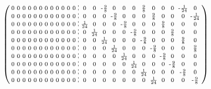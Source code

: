 \documentclass[pdftex,a4paper,parskip,listof=totoc,bibliography=totoc,onehalfspacing,12pt]{scrreprt}
\newcommand*\dashline{\hspace{-0.3em}\rotatebox[origin=c]{90}{\scalebox{-0.3}[1]{$-~~-$}}\hspace{-0.3em}}
\begin{document}
\begin{align*}
\begin{psmallmatrix}
0 & 0 & 0 & 0 & 0 & 0 & 0 & 0 & 0 & 0 & 0 & 0 &\dashline& 0 & 0 & \text{-}\frac{9}{8} & 0 & 0 & 0 & \frac{9}{8} & 0 & 0 & 0 & \text{-}\frac{1}{24} & 0 \\
0 & 0 & 0 & 0 & 0 & 0 & 0 & 0 & 0 & 0 & 0 & 0 &\dashline& 0 & 0 & 0 & \text{-}\frac{9}{8} & 0 & 0 & 0 & \frac{9}{8} & 0 & 0 & 0 & \text{-}\frac{1}{24} \\
0 & 0 & 0 & 0 & 0 & 0 & 0 & 0 & 0 & 0 & 0 & 0 &\dashline& \frac{1}{24} & 0 & 0 & 0 & \text{-}\frac{9}{8} & 0 & 0 & 0 & \frac{9}{8} & 0 & 0 & 0 \\
0 & 0 & 0 & 0 & 0 & 0 & 0 & 0 & 0 & 0 & 0 & 0 &\dashline& 0 & \frac{1}{24} & 0 & 0 & 0 & \text{-}\frac{9}{8} & 0 & 0 & 0 & \frac{9}{8} & 0 & 0 \\
0 & 0 & 0 & 0 & 0 & 0 & 0 & 0 & 0 & 0 & 0 & 0 &\dashline& 0 & 0 & \frac{1}{24} & 0 & 0 & 0 & \text{-}\frac{9}{8} & 0 & 0 & 0 & \frac{9}{8} & 0 \\
0 & 0 & 0 & 0 & 0 & 0 & 0 & 0 & 0 & 0 & 0 & 0 &\dashline& 0 & 0 & 0 & \frac{1}{24} & 0 & 0 & 0 & \text{-}\frac{9}{8} & 0 & 0 & 0 & \frac{9}{8} \\
0 & 0 & 0 & 0 & 0 & 0 & 0 & 0 & 0 & 0 & 0 & 0 &\dashline& 0 & 0 & 0 & 0 & \frac{1}{24} & 0 & 0 & 0 & \text{-}\frac{9}{8} & 0 & 0 & 0 \\
0 & 0 & 0 & 0 & 0 & 0 & 0 & 0 & 0 & 0 & 0 & 0 &\dashline& 0 & 0 & 0 & 0 & 0 & \frac{1}{24} & 0 & 0 & 0 & \text{-}\frac{9}{8} & 0 & 0 \\
0 & 0 & 0 & 0 & 0 & 0 & 0 & 0 & 0 & 0 & 0 & 0 &\dashline& 0 & 0 & 0 & 0 & 0 & 0 & \frac{1}{24} & 0 & 0 & 0 & \text{-}\frac{9}{8} & 0 \\
0 & 0 & 0 & 0 & 0 & 0 & 0 & 0 & 0 & 0 & 0 & 0 &\dashline& 0 & 0 & 0 & 0 & 0 & 0 & 0 & \frac{1}{24} & 0 & 0 & 0 & \text{-}\frac{9}{8} \\
\end{psmallmatrix}
\end{align*}
\end{document}
